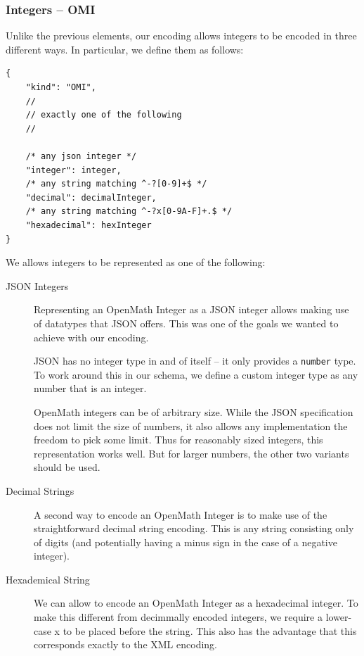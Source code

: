 \subsubsection{Integers -- OMI}

Unlike the previous elements, our encoding allows integers to be encoded in three different ways. 
In particular, we define them as follows:
\\\begin{minipage}{\linewidth}\begin{lstlisting}
{
    "kind": "OMI",
    //
    // exactly one of the following
    //

    /* any json integer */
    "integer": integer,
    /* any string matching ^-?[0-9]+$ */
    "decimal": decimalInteger,
    /* any string matching ^-?x[0-9A-F]+.$ */
    "hexadecimal": hexInteger
}
\end{lstlisting}\end{minipage}

We allows integers to be represented as one of the following:
\begin{description}
    \item[JSON Integers]
    Representing an OpenMath Integer as a JSON integer allows making use of datatypes that JSON offers. 
    This was one of the goals we wanted to achieve with our encoding. 
    
    JSON has no integer type in and of itself -- it only provides a \texttt{number} type. 
    To work around this in our schema, we define a custom integer type as any number that is an integer. 
        
    OpenMath integers can be of arbitrary size. 
    While the JSON specification does not limit the size of numbers, it also allows any implementation the freedom to pick some limit. 
    Thus for reasonably sized integers, this representation works well. 
    But for larger numbers, the other two variants should be used. 

    \item[Decimal Strings]
    A second way to encode an OpenMath Integer is to make use of the straightforward decimal string encoding. 
    This is any string consisting only of digits (and potentially having a minus sign in the case of a negative integer). 

    \item[Hexademical String]
    We can allow to encode an OpenMath Integer as a hexadecimal integer. 
    To make this different from decimmally encoded integers, we require a lower-case x to be placed before the string. 
    This also has the advantage that this corresponds exactly to the XML encoding.     
\end{description}

